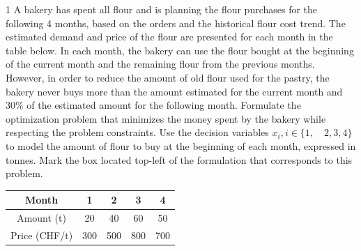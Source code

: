 
\showanswertrue
\begin{question}{1}
	\bareme{\baremeSingle}
A bakery has spent all flour and is planning the flour purchases for the following 4 months, based
on the orders and the historical flour cost trend. The estimated demand and price of the flour are
presented for each month in the table below. In each month, the bakery can use the flour bought at the
beginning of the current month and the remaining flour from the previous months. However, in order
to reduce the amount of old flour used for the pastry, the bakery never buys more than the amount
estimated for the current month and 30\% of the estimated amount for the following month.
Formulate the optimization problem that minimizes the money spent by the bakery while respecting the
problem constraints. Use the decision variables $x_i, i \in \{1,\quad 2, 3, 4\}$ to model the amount of flour to buy
at the beginning of each month, expressed in tonnes. Mark the box located top-left of the formulation
that corresponds to this problem.

	\begin{table}[h!]
	\centering
	\begin{tabular}{ccccc}
		Month & 1 & 2 & 3 & 4\\
		\hline
		Amount (t) & 20 & 40 & 60 & 50 \\
		Price (CHF/t) & 300& 500 & 800 & 700
	\end{tabular}
	\end{table}

			\begin{reponses}


\end{reponses}
\end{question}

